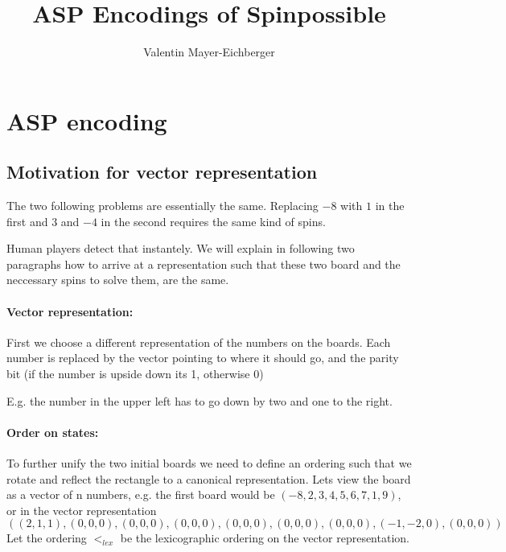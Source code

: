 \documentclass[]{llncs}
\author{Valentin Mayer-Eichberger}
\institute{IVU Traffice Technologies\\ Bundesallee 88, 12000 Berlin\\
\email{vme@ivu.de}}
\title{ASP Encodings of Spinpossible}
\newcommand{\spintable}[9]{ 
\node [matrix,ampersand replacement=\&,nodes={minimum size=4mm}]
{
    \node {#1}; \& \node{#2}; \& \node {#3}; \\ 
    \node {#4}; \& \node{#5}; \& \node {#6}; \\ 
    \node {#7}; \& \node{#8}; \& \node {#9}; \\ 
}; 
}
\begin{document}
 \maketitle

\section{ASP encoding}



\subsection{Motivation for vector representation}

The two following problems are essentially the same. Replacing $-8$ with $1$ in the
first and $3$ and $-4$ in the second requires the same kind of spins. 


Human players detect that instantely. We will explain in following two paragraphs how
to arrive at a representation such that these two board and the neccessary spins to
solve them, are the same. 

\paragraph{Vector representation: } First we choose a different representation of the
numbers on the boards. Each number is replaced by the vector pointing to where it
should go, and the parity bit (if the number is upside down its 1, otherwise 0)


E.g. the number in the upper left has to go down by two and one to the right. 


\paragraph{Order on states: } To further unify the two initial boards we need to
define an ordering such that we rotate and reflect the rectangle to a canonical
representation. Lets view the board as a vector of n numbers, e.g. the first board
would be $(-8,2,3,4,5,6,7,1,9)$, or in the vector representation 
\[
((2,1,1),(0,0,0),(0,0,0),(0,0,0),(0,0,0),(0,0,0),(0,0,0),(-1,-2,0),(0,0,0)) 
\] 
Let the ordering $<_{lex}$ be the lexicographic ordering on the vector representation.
\end{document}
